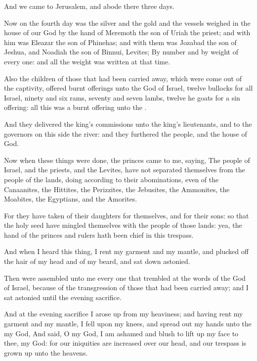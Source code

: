 \Verse And we came to Jerusalem, and abode there three days.

\Verse Now on the fourth day was the silver and the gold and the vessels weighed in the house of our God by the hand of Meremoth the son of Uriah the priest; and with him was Eleazar the son of Phinehas; and with them was Jozabad the son of Jeshua, and Noadiah the son of Binnui, Levites; \Verse By number and by weight of every one: and all the weight was written at that time.

\Verse Also the children of those that had been carried away, which were come out of the captivity, offered burnt offerings unto the God of Israel, twelve bullocks for all Israel, ninety and six rams, seventy and seven lambs, twelve he goats for a sin offering: all this was a burnt offering unto the \LORD.

\Verse And they delivered the king's commissions unto the king's lieutenants, and to the governors on this side the river: and they furthered the people, and the house of God.


\Chapter
\Verse Now when these things were done, the princes came to me, saying, The people of Israel, and the priests, and the Levites, have not separated themselves from the people of the lands, doing according to their abominations, even of the Canaanites, the Hittites, the Perizzites, the Jebusites, the Ammonites, the Moabites, the Egyptians, and the Amorites.

\Verse For they have taken of their daughters for themselves, and for their sons: so that the holy seed have mingled themselves with the people of those lands: yea, the hand of the princes and rulers hath been chief in this trespass.

\Verse And when I heard this thing, I rent my garment and my mantle, and plucked off the hair of my head and of my beard, and sat down astonied.

\Verse Then were assembled unto me every one that trembled at the words of the God of Israel, because of the transgression of those that had been carried away; and I sat astonied until the evening sacrifice.

\Verse And at the evening sacrifice I arose up from my heaviness; and having rent my garment and my mantle, I fell upon my knees, and spread out my hands unto the \LORD my God, \Verse And said, O my God, I am ashamed and blush to lift up my face to thee, my God: for our iniquities are increased over our head, and our trespass is grown up unto the heavens.

